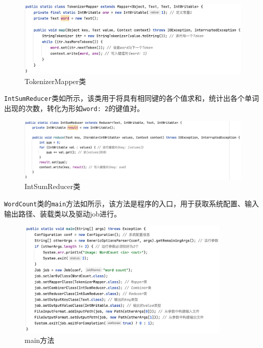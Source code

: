 \documentclass[lang=cn,11pt,a4paper,cite=authornum]{paper}
\begin{document}
\begin{figure}[!htb]
    \centering
    \includegraphics[width=\textwidth]{./images/map.jpg}
    \caption{TokenizerMapper类\label{fig:map}}
\end{figure}

\texttt{IntSumReducer}类如所示，该类用于将具有相同键的各个值求和，统计出各个单词出现的次数，转化为形如\texttt{{word: 2}}的键值对。

\begin{figure}[!htb]
    \centering
    \includegraphics[width=\textwidth]{./images/reduce.jpg}
    \caption{IntSumReducer类\label{fig:reduce}}
\end{figure}

\texttt{WordCount}类的\texttt{main}方法如所示，该方法是程序的入口，用于获取系统配置、输入输出路径、装载类以及驱动job进行。

\begin{figure}[!htb]
    \centering
    \includegraphics[width=0.9\textwidth]{./images/main.jpg}
    \caption{main方法\label{fig:main}}
\end{figure}
\end{document}
